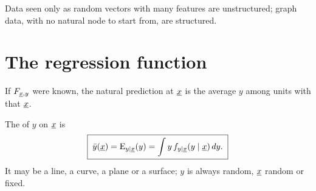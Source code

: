 Data seen only as random vectors with many features are unstructured; graph data, with no natural node to start from, are structured.

\section{The regression function}

If $F_{\underline{x},y}$ were known, the natural prediction at $\underline{x}$ is the average $y$ among units with that $\underline{x}$.

\begin{definition}
The  of $y$ on $\underline{x}$ is
\[
  \boxed{\;\bar y(\underline{x})=\operatorname{E}_{y\mid\underline{x}}(y)=\int y\,f_{y\mid\underline{x}}(y\mid\underline{x})\,dy.\;}
\]
It may be a line, a curve, a plane or a surface; $y$ is always random, $\underline{x}$ random or fixed.
\end{definition}

